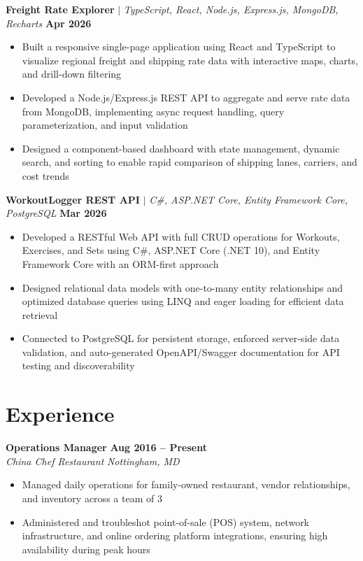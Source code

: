 \documentclass[11pt,letterpaper]{article}
\newcommand{\job}[4]{
    \noindent\textbf{#1} \hfill \textbf{#2}\\
    \textit{#3} \hfill \textit{#4}
}
\newcommand{\project}[3]{
    \noindent\textbf{#1} $\mid$ \textit{#2} \hfill \textbf{#3}
}
\begin{document}
\project{Freight Rate Explorer}{TypeScript, React, Node.js, Express.js, MongoDB, Recharts}{Apr 2026}
\begin{itemize}
    \item Built a responsive single-page application using React and TypeScript to visualize regional freight and shipping rate data with interactive maps, charts, and drill-down filtering
    \item Developed a Node.js/Express.js REST API to aggregate and serve rate data from MongoDB, implementing async request handling, query parameterization, and input validation
    \item Designed a component-based dashboard with state management, dynamic search, and sorting to enable rapid comparison of shipping lanes, carriers, and cost trends
\end{itemize}

\project{WorkoutLogger REST API}{C\#, ASP.NET Core, Entity Framework Core, PostgreSQL}{Mar 2026}
\begin{itemize}
    \item Developed a RESTful Web API with full CRUD operations for Workouts, Exercises, and Sets using C\#, ASP.NET Core (.NET 10), and Entity Framework Core with an ORM-first approach
    \item Designed relational data models with one-to-many entity relationships and optimized database queries using LINQ and eager loading for efficient data retrieval
    \item Connected to PostgreSQL for persistent storage, enforced server-side data validation, and auto-generated OpenAPI/Swagger documentation for API testing and discoverability
\end{itemize}

\section{Experience}

\job{Operations Manager}{Aug 2016 -- Present}{China Chef Restaurant}{Nottingham, MD}
\begin{itemize}
    \item Managed daily operations for family-owned restaurant, vendor relationships, and inventory across a team of 3
    \item Administered and troubleshot point-of-sale (POS) system, network infrastructure, and online ordering platform integrations, ensuring high availability during peak hours
\end{itemize}
\end{document}
